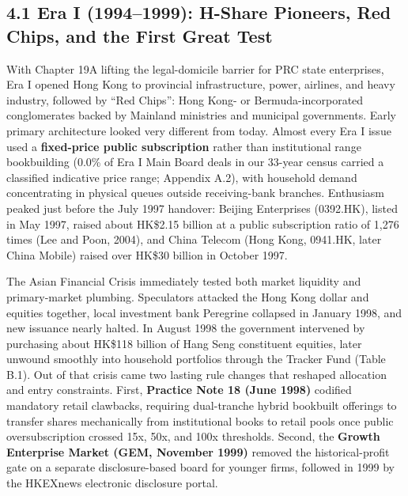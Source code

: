 \documentclass[11pt,letterpaper]{article}
\begin{document}
\subsection*{\texorpdfstring{4.1 Era I (1994–1999): H-Share Pioneers, Red Chips, and the First Great Test}{4.1 Era I (1994–1999): H-Share Pioneers, Red Chips, and the First Great Test}}
With Chapter 19A lifting the legal-domicile barrier for PRC state enterprises, Era I opened Hong Kong to provincial infrastructure, power, airlines, and heavy industry, followed by ``Red Chips'': Hong Kong- or Bermuda-incorporated conglomerates backed by Mainland ministries and municipal governments. Early primary architecture looked very different from today. Almost every Era I issue used a \textbf{fixed-price public subscription} rather than institutional range bookbuilding (0.0\% of Era I Main Board deals in our 33-year census carried a classified indicative price range; Appendix A.2), with household demand concentrating in physical queues outside receiving-bank branches. Enthusiasm peaked just before the July 1997 handover: Beijing Enterprises (0392.HK), listed in May 1997, raised about HK\$2.15 billion at a public subscription ratio of 1,276 times (Lee and Poon, 2004), and China Telecom (Hong Kong, 0941.HK, later China Mobile) raised over HK\$30 billion in October 1997.

The Asian Financial Crisis immediately tested both market liquidity and primary-market plumbing. Speculators attacked the Hong Kong dollar and equities together, local investment bank Peregrine collapsed in January 1998, and new issuance nearly halted. In August 1998 the government intervened by purchasing about HK\$118 billion of Hang Seng constituent equities, later unwound smoothly into household portfolios through the Tracker Fund (Table B.1). Out of that crisis came two lasting rule changes that reshaped allocation and entry constraints. First, \textbf{Practice Note 18 (June 1998)} codified mandatory retail clawbacks, requiring dual-tranche hybrid bookbuilt offerings to transfer shares mechanically from institutional books to retail pools once public oversubscription crossed 15x, 50x, and 100x thresholds. Second, the \textbf{Growth Enterprise Market (GEM, November 1999)} removed the historical-profit gate on a separate disclosure-based board for younger firms, followed in 1999 by the HKEXnews electronic disclosure portal.
\end{document}
